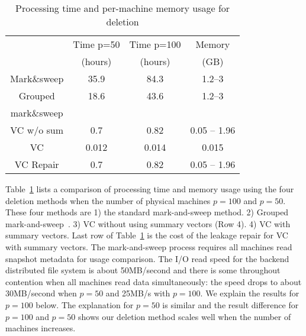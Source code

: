 

\begin{table}[htb]
\centering
\begin{tabular}{|c|c|c|c|}
    \hline 
	    &Time p=50 & Time p=100 & Memory \\
	    &(hours)  & (hours) & (GB) \\
\hline
Mark\&sweep  & 35.9  &  84.3  & 1.2--3 \\
\hline
Grouped &     18.6    & 43.6   & 1.2--3 \\
mark\&sweep &        &    &  \\
\hline
VC w/o sum &  0.7     & 0.82   & 0.05 -- 1.96 \\
\hline
VC  &  0.012      & 0.014   & 0.015  \\
\hline
\hline
VC Repair  &  0.7      & 0.82   & 0.05 -- 1.96 \\
\hline
    \end{tabular}
    \caption{ Processing time and per-machine memory usage  for
deletion}  
    \label{tab:deletion-cmp}
\end{table}

Table~\ref{tab:deletion-cmp}   lists a comparison of processing time and memory usage
using the four deletion methods when the number of physical machines
$p=100$ and $p=50$. These four 
methods are 1) the standard mark-and-sweep method. 2) Grouped mark-and-sweep~\cite{Guo2011}. 
3)   VC without using summary vectors (Row 4). 4) VC with summary vectors.
Last row of Table~\ref{tab:deletion-cmp} 
is the cost of the leakage  repair for VC with summary vectors.
The mark-and-sweep process requires all machines read snapshot metadata for usage comparison.
The I/O read speed for the backend distributed file system is about 50MB/second
and there is some throughout contention when all machines read data simultaneously:
the speed drops to about 30MB/second when $p=50$ and 25MB/s with $p=100$.
We explain the results for $p=100$ below.
The explanation for $p=50$ is similar and the result difference for $p=100$ and $p=50$ shows
our deletion method scales well when the number of machines increases.


